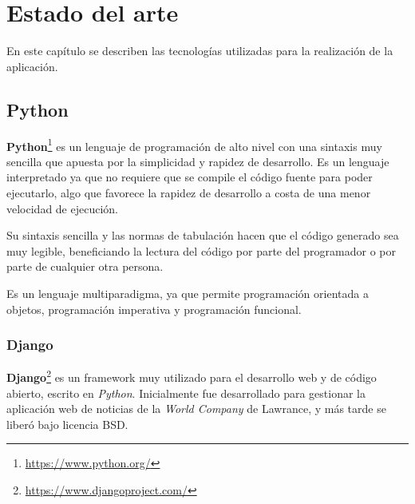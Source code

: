 \documentclass[a4paper, 12pt]{book}
\begin{document}

\cleardoublepage
\chapter{Estado del arte}

En este capítulo se describen las tecnologías utilizadas para la realización de la aplicación.




\section{Python} 
\label{sec:python}

\textbf{Python}\footnote{\url{https://www.python.org/}} es un lenguaje de programación de alto nivel con una sintaxis muy sencilla que apuesta por la simplicidad y rapidez de desarrollo. Es un lenguaje interpretado ya que no requiere que se compile el código fuente para poder ejecutarlo, algo que favorece la rapidez de desarrollo a costa de una menor velocidad de ejecución.
\newline

Su sintaxis sencilla y las normas de tabulación hacen que el código generado sea muy legible, beneficiando la lectura del código por parte del programador o por parte de cualquier otra persona.
\newline

Es un lenguaje multiparadigma, ya que permite programación orientada a objetos, programación imperativa y programación funcional.


\subsection{Django} 
\label{subsec:django}

\textbf{Django}\footnote{\url{https://www.djangoproject.com/}} es un framework muy utilizado para el desarrollo web y de código abierto, escrito en \textit{Python}. Inicialmente fue desarrollado para gestionar la aplicación web de noticias de la \textit{World Company} de Lawrance, y más tarde se liberó bajo licencia BSD.
\newline
\end{document}
